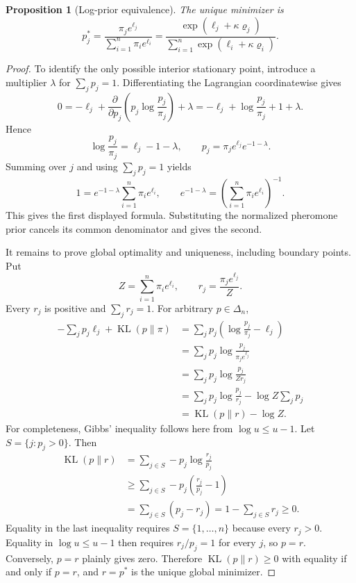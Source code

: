 \documentclass[11pt,oneside]{book}
\newtheorem{proposition}[definition]{Proposition}
\theoremstyle{remark}
\DeclareMathOperator{\KL}{KL}
\begin{document}
\begin{proposition}[Log-prior equivalence]
The unique minimizer is
\[
p_j^*=
\frac{\pi_je^{\ell_j}}{\sum_{i=1}^n\pi_i e^{\ell_i}}
=\frac{\exp(\ell_j+\kappa\varrho_j)}
{\sum_{i=1}^n\exp(\ell_i+\kappa\varrho_i)}.
\]
\end{proposition}

\begin{proof}
To identify the only possible interior stationary point, introduce a
multiplier $\lambda$ for
$\sum_jp_j=1$. Differentiating the Lagrangian coordinatewise gives
\[
0=-\ell_j+\frac{\partial}{\partial p_j}
\left(p_j\log\frac{p_j}{\pi_j}\right)+\lambda
=-\ell_j+\log\frac{p_j}{\pi_j}+1+\lambda.
\]
Hence
\[
\log\frac{p_j}{\pi_j}=\ell_j-1-\lambda,
\qquad
p_j=\pi_j e^{\ell_j}e^{-1-\lambda}.
\]
Summing over $j$ and using $\sum_jp_j=1$ yields
\[
1=e^{-1-\lambda}\sum_{i=1}^n\pi_i e^{\ell_i},
\qquad
e^{-1-\lambda}=
\left(\sum_{i=1}^n\pi_i e^{\ell_i}\right)^{-1}.
\]
This gives the first displayed formula. Substituting the normalized
pheromone prior cancels its common denominator and gives the second.

It remains to prove global optimality and uniqueness, including boundary
points. Put
\[
Z=\sum_{i=1}^n\pi_i e^{\ell_i},
\qquad
r_j=\frac{\pi_je^{\ell_j}}Z.
\]
Every $r_j$ is positive and $\sum_jr_j=1$. For arbitrary $p\in\Delta_n$,
\[
\begin{aligned}
-\sum_jp_j\ell_j+\KL(p\|\pi)
&=\sum_jp_j\left(\log\frac{p_j}{\pi_j}-\ell_j\right)\\
&=\sum_jp_j\log\frac{p_j}{\pi_je^{\ell_j}}\\
&=\sum_jp_j\log\frac{p_j}{Zr_j}\\
&=\sum_jp_j\log\frac{p_j}{r_j}-\log Z\sum_jp_j\\
&=\KL(p\|r)-\log Z.
\end{aligned}
\]
For completeness, Gibbs' inequality follows here from
$\log u\le u-1$. Let $S=\{j:p_j>0\}$. Then
\[
\begin{aligned}
\KL(p\|r)
&=\sum_{j\in S}-p_j\log\frac{r_j}{p_j}\\
&\ge\sum_{j\in S}-p_j\left(\frac{r_j}{p_j}-1\right)\\
&=\sum_{j\in S}(p_j-r_j)
=1-\sum_{j\in S}r_j
\ge0.
\end{aligned}
\]
Equality in the last inequality requires $S=\{1,\ldots,n\}$ because every
$r_j>0$. Equality in $\log u\le u-1$ then requires
$r_j/p_j=1$ for every $j$, so $p=r$. Conversely, $p=r$ plainly gives zero.
Therefore $\KL(p\|r)\ge0$ with equality if and only if $p=r$, and
$r=p^*$ is the unique global minimizer.
\end{proof}
\end{document}
